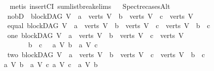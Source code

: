 \begin{isabellebody}
\ \ \isamarkupfalse%
\ {\isacharparenleft}{\kern0pt}metis\ insertCI\ sumlist{\isacharunderscore}{\kern0pt}break{\isachardot}{\kern0pt}elims{\isacharparenright}{\kern0pt}%
\endisatagproof
{\isafoldproof}%
%
\isadelimproof
\ \isanewline
%
\endisadelimproof
\isanewline
{}\isamarkupfalse%
\ Spectre{\isacharunderscore}{\kern0pt}casesAlt{\isacharcolon}{\kern0pt}\isanewline
\ \ \ {\isacharparenleft}{\kern0pt}no{\isacharunderscore}{\kern0pt}bD{\isacharparenright}{\kern0pt}\ {\isachardoublequoteopen}{\isacharparenleft}{\kern0pt}{\isasymnot}\ blockDAG\ V\ {\isasymor}\ a\ {\isasymnotin}\ verts\ V\ {\isasymor}\ b\ {\isasymnotin}\ verts\ V\ {\isasymor}\ c\ {\isasymnotin}\ verts\ V{\isacharparenright}{\kern0pt}{\isachardoublequoteclose}\isanewline
\ \ {\isacharbar}{\kern0pt}\ {\isacharparenleft}{\kern0pt}equal{\isacharparenright}{\kern0pt}\ {\isachardoublequoteopen}{\isacharparenleft}{\kern0pt}blockDAG\ V\ {\isasymand}\ a\ {\isasymin}\ verts\ V\ {\isasymor}\ b\ {\isasymin}\ verts\ V\ {\isasymor}\ c\ {\isasymin}\ verts\ V{\isacharparenright}{\kern0pt}\ {\isasymand}\ b\ {\isacharequal}{\kern0pt}\ c{\isachardoublequoteclose}\ \isanewline
\ \ {\isacharbar}{\kern0pt}\ {\isacharparenleft}{\kern0pt}one{\isacharparenright}{\kern0pt}\ {\isachardoublequoteopen}{\isacharparenleft}{\kern0pt}blockDAG\ V\ {\isasymand}\ a\ {\isasymin}\ verts\ V\ {\isasymor}\ b\ {\isasymin}\ verts\ V\ {\isasymor}\ c\ {\isasymin}\ verts\ V{\isacharparenright}{\kern0pt}\ {\isasymand}\isanewline
\ \ \ \ \ \ \ \ \ b\ {\isasymnoteq}\ c\ \ {\isasymand}\ {\isacharparenleft}{\kern0pt}{\isacharparenleft}{\kern0pt}a\ {\isasymrightarrow}\isactrlsup {\isacharasterisk}{\kern0pt}\isactrlbsub V\isactrlesub \ b{\isacharparenright}{\kern0pt}\ {\isasymand}\ {\isasymnot}{\isacharparenleft}{\kern0pt}a\ {\isasymrightarrow}\isactrlsup {\isacharplus}{\kern0pt}\isactrlbsub V\isactrlesub \ c{\isacharparenright}{\kern0pt}{\isacharparenright}{\kern0pt}{\isachardoublequoteclose}\ \isanewline
\ \ {\isacharbar}{\kern0pt}\ {\isacharparenleft}{\kern0pt}two{\isacharparenright}{\kern0pt}\ {\isachardoublequoteopen}{\isacharparenleft}{\kern0pt}blockDAG\ V\ {\isasymand}\ a\ {\isasymin}\ verts\ V\ {\isasymor}\ b\ {\isasymin}\ verts\ V\ {\isasymor}\ c\ {\isasymin}\ verts\ V{\isacharparenright}{\kern0pt}\ {\isasymand}\ b\ {\isasymnoteq}\ c\ \ {\isasymand}\ \isanewline
\ \ {\isasymnot}{\isacharparenleft}{\kern0pt}{\isacharparenleft}{\kern0pt}a\ {\isasymrightarrow}\isactrlsup {\isacharasterisk}{\kern0pt}\isactrlbsub V\isactrlesub \ b{\isacharparenright}{\kern0pt}\ {\isasymand}\ {\isasymnot}{\isacharparenleft}{\kern0pt}a\ {\isasymrightarrow}\isactrlsup {\isacharplus}{\kern0pt}\isactrlbsub V\isactrlesub \ c{\isacharparenright}{\kern0pt}{\isacharparenright}{\kern0pt}{\isasymand}\ {\isacharparenleft}{\kern0pt}{\isacharparenleft}{\kern0pt}a\ {\isasymrightarrow}\isactrlsup {\isacharasterisk}{\kern0pt}\isactrlbsub V\isactrlesub \ c{\isacharparenright}{\kern0pt}\ {\isasymand}\ {\isasymnot}{\isacharparenleft}{\kern0pt}a\ {\isasymrightarrow}\isactrlsup {\isacharplus}{\kern0pt}\isactrlbsub V\isactrlesub \ b{\isacharparenright}{\kern0pt}{\isacharparenright}{\kern0pt}{\isachardoublequoteclose}\isanewline

\end{isabellebody}
